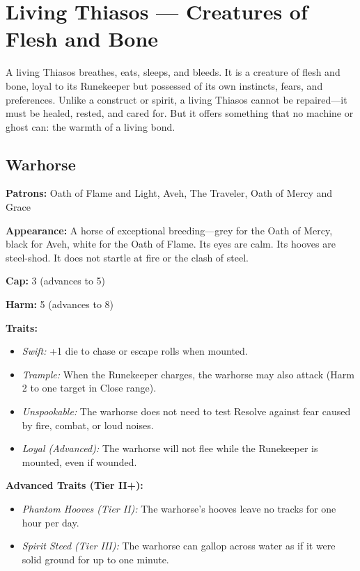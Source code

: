 \section{Living Thiasos — Creatures of Flesh and Bone}

A living Thiasos breathes, eats, sleeps, and bleeds. It is a creature of flesh and bone, loyal to its Runekeeper but possessed of its own instincts, fears, and preferences. Unlike a construct or spirit, a living Thiasos cannot be repaired—it must be healed, rested, and cared for. But it offers something that no machine or ghost can: the warmth of a living bond.

\subsection{Warhorse}

\noindent\textbf{Patrons:} Oath of Flame and Light, Aveh, The Traveler, Oath of Mercy and Grace

\noindent\textbf{Appearance:} A horse of exceptional breeding—grey for the Oath of Mercy, black for Aveh, white for the Oath of Flame. Its eyes are calm. Its hooves are steel-shod. It does not startle at fire or the clash of steel.

\noindent\textbf{Cap:} 3 (advances to 5)

\noindent\textbf{Harm:} 5 (advances to 8)

\noindent\textbf{Traits:}

\begin{itemize}
\item \textit{Swift:} +1 die to chase or escape rolls when mounted.
\item \textit{Trample:} When the Runekeeper charges, the warhorse may also attack (Harm 2 to one target in Close range).
\item \textit{Unspookable:} The warhorse does not need to test Resolve against fear caused by fire, combat, or loud noises.
\item \textit{Loyal (Advanced):} The warhorse will not flee while the Runekeeper is mounted, even if wounded.
\end{itemize}

\noindent\textbf{Advanced Traits (Tier II+):}
\begin{itemize}
\item \textit{Phantom Hooves (Tier II):} The warhorse's hooves leave no tracks for one hour per day.
\item \textit{Spirit Steed (Tier III):} The warhorse can gallop across water as if it were solid ground for up to one minute.
\end{itemize}

